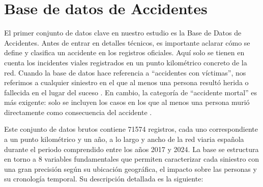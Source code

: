 \documentclass[twoside,a4paper,12pt,onecolumn,openany]{book}
\begin{document}
\vspace{0.5cm}
\section{Base de datos de Accidentes}
\vspace{0.5cm}

El primer conjunto de datos clave en nuestro estudio es la Base de Datos de Accidentes. Antes de entrar en detalles técnicos, es importante aclarar cómo se define y clasifica un accidente en los registros oficiales. Aquí solo se tienen en cuenta los incidentes viales registrados en un punto kilométrico concreto de la red. Cuando la base de datos hace referencia a ``accidentes con víctimas'', nos referimos a cualquier siniestro en el que al menos una persona resultó herida o fallecida en el lugar del suceso \cite{orden_accidentes}. En cambio, la categoría de ``accidente mortal'' es más exigente: solo se incluyen los casos en los que al menos una persona murió directamente como consecuencia del accidente \cite{orden_accidentes}.

\vspace{0.5cm}

Este conjunto de datos brutos contiene 71574 registros, cada uno correspondiente a un punto kilométrico y un año, a lo largo y ancho de la red viaria española durante el periodo comprendido entre los años 2017 y 2024. La base se estructura en torno a 8 variables fundamentales que permiten caracterizar cada siniestro con una gran precisión según su ubicación geográfica, el impacto sobre las personas y su cronología temporal. Su descripción detallada es la siguiente:
\end{document}
